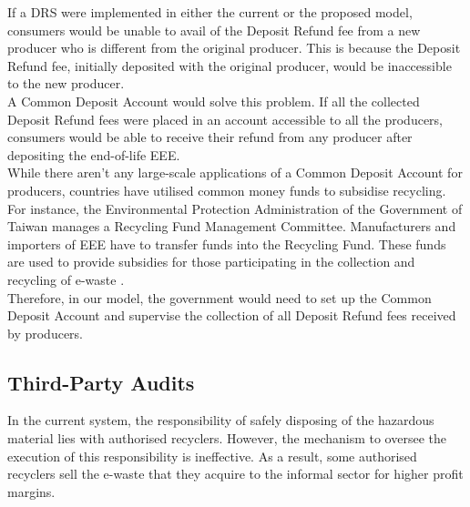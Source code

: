 \documentclass[a4paper, 12pt]{article}
\begin{document}
                    If a DRS were implemented in either the current or the proposed model, consumers would be unable to avail of the Deposit Refund fee from a new producer who is different from the original producer. This is because the Deposit Refund fee, initially deposited with the original producer, would be inaccessible to the new producer.\\
                    
                    A Common Deposit Account would solve this problem. If all the collected Deposit Refund fees were placed in an account accessible to all the producers, consumers would be able to receive their refund from any producer after depositing the end-of-life EEE.\\
                    
                    While there aren’t any large-scale applications of a Common Deposit Account for producers, countries have utilised common money funds to subsidise recycling. For instance, the Environmental Protection Administration of the Government of Taiwan manages a Recycling Fund Management Committee. Manufacturers and importers of EEE have to transfer funds into the Recycling Fund. These funds are used to provide subsidies for those participating in the collection and recycling of e-waste \parencite{chungchapter}.\\
                    
                    Therefore, in our model, the government would need to set up the Common Deposit Account and supervise the collection of all Deposit Refund fees received by producers.
                    
                    \subsection{Third-Party Audits}
                    
                    In the current system, the responsibility of safely disposing of the hazardous material lies with authorised recyclers. However, the mechanism to oversee the execution of this responsibility is ineffective. As a result, some authorised recyclers sell the e-waste that they acquire to the informal sector for higher profit margins.\\
                    
\end{document}
